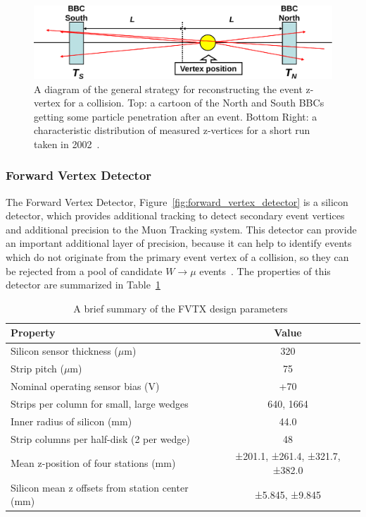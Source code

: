 \begin{figure}[ht]
  \centering
  \includegraphics[width=\linewidth]{./figures/bbc_vertex_reconstruction}
  \caption{
    A diagram of the general strategy for reconstructing the event z-vertex for
    a collision. Top: a cartoon of the North and South BBCs getting some
    particle penetration after an event. Bottom Right: a characteristic
    distribution of measured z-vertices for a short run taken in
    2002~\cite{Nakamura2002}.
  }
  \label{fig:bbc_vertex_reconstruction}
\end{figure}

\subsubsection{Forward Vertex Detector}

The Forward Vertex Detector, Figure~\ref{fig:forward_vertex_detector} is a
silicon detector, which provides additional tracking to detect secondary event
vertices and additional precision to the Muon Tracking system. This detector can
provide an important additional layer of precision, because it can help to
identify events which do not originate from the primary event vertex of a
collision, so they can be rejected from a pool of candidate $W\rightarrow\mu$
events~\cite{Aidala2014}. The properties of this detector are summarized in
Table~\ref{tab:fvtx_properties}

\begin{table}[ht]
  \centering
  \begin{tabular}{lc}
    \toprule
    \textbf{Property} & \textbf{Value}\\
    \midrule
    Silicon sensor thickness ($\mu$m) &	320\\
    Strip pitch ($\mu$m) &	75\\
    Nominal operating sensor bias (V)	& +70\\
    Strips per column for small, large wedges	& 640, 1664\\
    Inner radius of silicon (mm) &	44.0\\
    Strip columns per half-disk (2 per wedge) &	48\\
    Mean z-position of four stations (mm)	& ±201.1, ±261.4, ±321.7, ±382.0\\
    Silicon mean z offsets from station center (mm) & 	±5.845, ±9.845\\
    \bottomrule
  \end{tabular}
  \caption{
    A brief summary of the FVTX design parameters~\cite{Aidala2014}
  }
  \label{tab:fvtx_properties}
\end{table}

